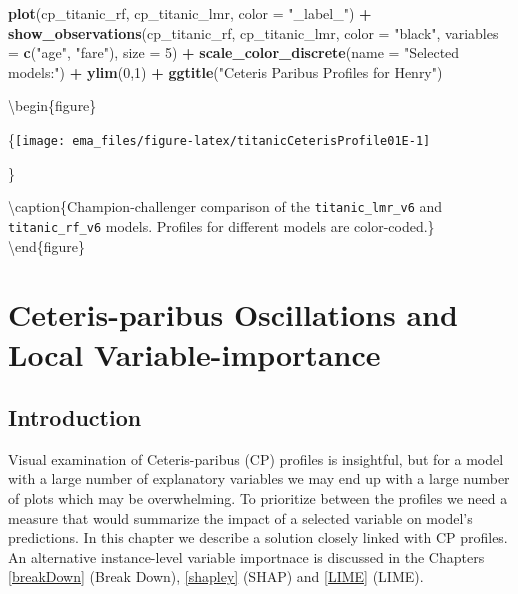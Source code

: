 \documentclass[12pt,]{krantz}
\newenvironment{Shaded}{\begin{snugshade}}{\end{snugshade}}
\newcommand{\DataTypeTok}[1]{\textcolor[rgb]{0.13,0.29,0.53}{#1}}
\newcommand{\DecValTok}[1]{\textcolor[rgb]{0.00,0.00,0.81}{#1}}
\newcommand{\KeywordTok}[1]{\textcolor[rgb]{0.13,0.29,0.53}{\textbf{#1}}}
\newcommand{\NormalTok}[1]{#1}
\newcommand{\OperatorTok}[1]{\textcolor[rgb]{0.81,0.36,0.00}{\textbf{#1}}}
\newcommand{\StringTok}[1]{\textcolor[rgb]{0.31,0.60,0.02}{#1}}
\begin{document}
\begin{Shaded}
\begin{Highlighting}[]
\KeywordTok{plot}\NormalTok{(cp_titanic_rf, cp_titanic_lmr, }\DataTypeTok{color =} \StringTok{"_label_"}\NormalTok{) }\OperatorTok{+}
\StringTok{  }\KeywordTok{show_observations}\NormalTok{(cp_titanic_rf, cp_titanic_lmr, }\DataTypeTok{color =} \StringTok{"black"}\NormalTok{, }\DataTypeTok{variables =} \KeywordTok{c}\NormalTok{(}\StringTok{"age"}\NormalTok{, }\StringTok{"fare"}\NormalTok{), }\DataTypeTok{size =} \DecValTok{5}\NormalTok{) }\OperatorTok{+}
\StringTok{  }\KeywordTok{scale_color_discrete}\NormalTok{(}\DataTypeTok{name =} \StringTok{"Selected models:"}\NormalTok{) }\OperatorTok{+}\StringTok{ }\KeywordTok{ylim}\NormalTok{(}\DecValTok{0}\NormalTok{,}\DecValTok{1}\NormalTok{) }\OperatorTok{+}\StringTok{ }
\StringTok{  }\KeywordTok{ggtitle}\NormalTok{(}\StringTok{"Ceteris Paribus Profiles for Henry"}\NormalTok{)}
\end{Highlighting}
\end{Shaded}

\textbackslash{}begin\{figure\}

\{\centering \texttt{[image: ema\_files/figure-latex/titanicCeterisProfile01E-1]}

\}

\textbackslash{}caption\{Champion-challenger comparison of the \texttt{titanic\_lmr\_v6} and \texttt{titanic\_rf\_v6} models. Profiles for different models are color-coded.\}\label{fig:titanicCeterisProfile01E}
\textbackslash{}end\{figure\}

\hypertarget{ceterisParibusOscillations}{%
\section{Ceteris-paribus Oscillations and Local Variable-importance}\label{ceterisParibusOscillations}}

\hypertarget{CPOscIntro}{%
\subsection{Introduction}\label{CPOscIntro}}

Visual examination of Ceteris-paribus (CP) profiles is insightful, but for a model with a large number of explanatory variables we may end up with a large number of plots which may be overwhelming. To prioritize between the profiles we need a measure that would summarize the impact of a selected variable on model's predictions. In this chapter we describe a solution closely linked with CP profiles. An alternative instance-level variable importnace is discussed in the Chapters \ref{breakDown} (Break Down), \ref{shapley} (SHAP) and \ref{LIME} (LIME).
\end{document}
